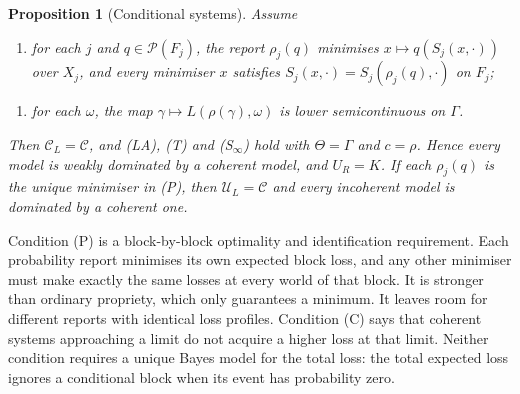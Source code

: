 \documentclass[11pt]{article}
\newtheorem{proposition}[theorem]{Proposition}
\theoremstyle{definition}
\theoremstyle{remark}
\newcommand{\C}{\mathcal C}
\newcommand{\U}{\mathcal U}
\newcommand{\PP}{\mathcal P}
\begin{document}
\begin{proposition}[Conditional systems]\label{prop:blocks}
Assume
\begin{enumerate}[label=\textbf{(P)},leftmargin=*]
\item for each $j$ and $q\in\PP(F_j)$, the report $\rho_j(q)$ minimises $x\mapsto q(S_j(x,\cdot))$ over $X_j$, and every minimiser $x$ satisfies $S_j(x,\cdot)=S_j(\rho_j(q),\cdot)$ on $F_j$;
\end{enumerate}
\begin{enumerate}[label=\textbf{(C)},leftmargin=*]
\item for each $\omega$, the map $\gamma\mapsto L(\rho(\gamma),\omega)$ is lower semicontinuous on $\Gamma$.
\end{enumerate}
Then $\C_L=\C$, and (LA), (T) and (S$_\infty$) hold with $\Theta=\Gamma$ and $c=\rho$. Hence every model is weakly dominated by a coherent model, and $U_R=K$. If each $\rho_j(q)$ is the \emph{unique} minimiser in (P), then $\U_L=\C$ and every incoherent model is dominated by a coherent one.
\end{proposition}

Condition (P) is a block-by-block optimality and identification requirement. Each probability report minimises its own expected block loss, and any other minimiser must make exactly the same losses at every world of that block. It is stronger than ordinary propriety, which only guarantees a minimum. It leaves room for different reports with identical loss profiles. Condition (C) says that coherent systems approaching a limit do not acquire a higher loss at that limit. Neither condition requires a unique Bayes model for the total loss: the total expected loss ignores a conditional block when its event has probability zero.
\end{document}
